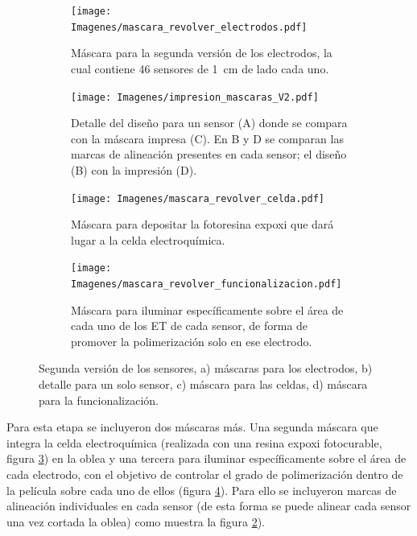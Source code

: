 {			     			\begin{figure}[th!]
			 	   	    \centering
			 	   	    \begin{subfigure}[t]{0.495\textwidth}
			        	\texttt{[image: Imagenes/mascara\_revolver\_electrodos.pdf]}
			       		\caption{Máscara para la segunda versión de los electrodos, la cual contiene 46 sensores de \SI{1}{cm} de lado cada uno.}
			         	\label{fig:mascara_v2}
			     		\end{subfigure}
			     		\begin{subfigure}[t]{0.495\textwidth}
			     		\texttt{[image: Imagenes/impresion\_mascaras\_V2.pdf]}
			    		\caption{Detalle del diseño para un sensor (A) donde se compara con la máscara impresa (C). En B y D se comparan las marcas de alineación presentes en cada sensor; el diseño (B) con la impresión (D).}
			     		\label{fig:impresion_diseno_v2_b}	
						\end{subfigure}
			     		\begin{subfigure}[t]{0.495\textwidth}
			         	\texttt{[image: Imagenes/mascara\_revolver\_celda.pdf]}
			        	\caption{Máscara para depositar la fotoresina expoxi que dará lugar a la celda electroquímica.}
			         	\label{fig:mascara_su8}
			     		\end{subfigure}
						\begin{subfigure}[t]{0.495\textwidth}
			     		\texttt{[image: Imagenes/mascara\_revolver\_funcionalizacion.pdf]}
			        	\caption{Máscara para iluminar específicamente sobre el área de cada uno de los ET de cada sensor, de forma de promover la polimerización solo en ese electrodo.}
			         	\label{fig:mascara_funcionalizacion}
			     		\end{subfigure}
			     		\caption[Juego de máscara. Segunda versión]{Segunda versión de los sensores, a) máscaras  para los electrodos, b) detalle para un solo sensor, c) máscara para las celdas, d) máscara para la funcionalización.}
			     		\label{fig:impresion_diseno_V2}
			     	   	\end{figure}
		 \newpage
			     		
		 Para esta etapa se incluyeron dos máscaras más. Una segunda máscara que integra la celda electroquímica (realizada con una resina expoxi fotocurable, figura \ref{fig:mascara_su8}) en la oblea y una tercera para iluminar específicamente sobre el área de cada electrodo, con el objetivo de controlar el grado de polimerización dentro de la película sobre cada uno de ellos (figura \ref{fig:mascara_funcionalizacion}). Para ello se incluyeron marcas de alineación individuales en cada sensor (de esta forma se puede alinear cada sensor una vez cortada la oblea) como muestra la figura \ref{fig:impresion_diseno_v2_b}).
		
}
